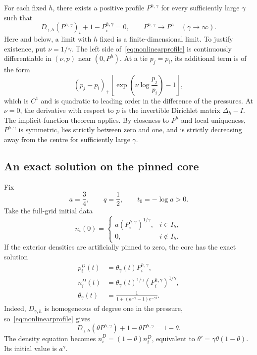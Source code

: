 \documentclass[11pt,a4paper]{article}
\theoremstyle{remark}
\begin{document}
For each fixed $h$, there exists a positive profile $P^{h,\gamma}$ for every sufficiently large $\gamma$ such that
\begin{equation}\label{eq:nonlinearprofile}
 D_{\gamma,h}(P^{h,\gamma})_i+1-P_i^{h,\gamma}=0,
 \qquad P^{h,\gamma}\longrightarrow P^h\quad(\gamma\to\infty).
\end{equation}
Here and below, a limit with $h$ fixed is a finite-dimensional limit. To justify existence, put $\nu=1/\gamma$. The left side of~\eqref{eq:nonlinearprofile} is continuously differentiable in $(\nu,p)$ near $(0,P^h)$. At a tie $p_j=p_i$, its additional term is of the form
\[
 (p_j-p_i)_+\left[\exp\!\left(\nu\log\frac{p_j}{p_i}\right)-1\right],
\]
which is $C^1$ and is quadratic to leading order in the difference of the pressures. At $\nu=0$, the derivative with respect to $p$ is the invertible Dirichlet matrix $\Delta_h-I$. The implicit-function theorem applies. By closeness to $P^h$ and local uniqueness, $P^{h,\gamma}$ is symmetric, lies strictly between zero and one, and is strictly decreasing away from the centre for sufficiently large $\gamma$.

\subsection{An exact solution on the pinned core}

Fix
\[
 a=\frac34,\qquad q=\frac12,\qquad t_0=-\log a>0.
\]
Take the full-grid initial data
\begin{equation}\label{eq:abinitial}
 n_i(0)=
 \begin{cases}
 a(P_i^{h,\gamma})^{1/\gamma},&i\in I_h,\\
 0,&i\notin I_h.
 \end{cases}
\end{equation}
If the exterior densities are artificially pinned to zero, the core has the exact solution
\begin{align}
 p_i^D(t)&=\theta_\gamma(t)P_i^{h,\gamma},\label{eq:corepressure}\\
 n_i^D(t)&=\theta_\gamma(t)^{1/\gamma}(P_i^{h,\gamma})^{1/\gamma},\label{eq:coredensity}\\
 \theta_\gamma(t)&=\frac1{1+(a^{-\gamma}-1)e^{-\gamma t}}.
 \label{eq:theta}
\end{align}
Indeed, $D_{\gamma,h}$ is homogeneous of degree one in the pressure, so~\eqref{eq:nonlinearprofile} gives
\[
 D_{\gamma,h}(\theta P^{h,\gamma})+1-\theta P^{h,\gamma}=1-\theta.
\]
The density equation becomes $\dot n_i^D=(1-\theta)n_i^D$, equivalent to $\theta'=\gamma\theta(1-\theta)$. Its initial value is $a^\gamma$.
\end{document}
